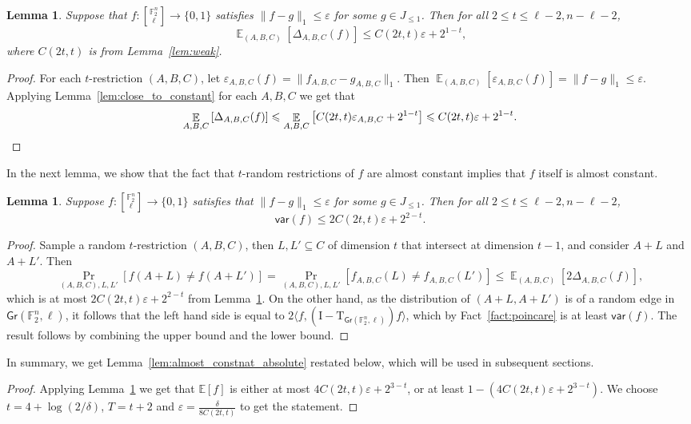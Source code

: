 \documentclass[11pt]{article}
\newtheorem{lemma}[thm]{Lemma}
\newcommand\E{\mathbb{E}}
\newcommand\Prob[2]{{\Pr_{#1}\left[ {#2} \right]}}
\newcommand\norm[1]{\| #1 \|}
\newcommand\Expect[2]{{\mathop{\mathbb{E}}_{#1}\left[ {#2} \right]}}
\newcommand\inner[2]{\langle{#1},{#2}\rangle}
\newcommand\eps{\varepsilon}
\renewcommand\geq{\geqslant}
\renewcommand\leq{\leqslant}
\providecommand{\sqbinom}[2]{\genfrac{[}{]}{0pt}{}{#1}{#2}}
\begin{document}
\begin{lemma}\label{lem:rests_are_constants}
    Suppose that $f\colon {\sqbinom{\mathbb{F}_2^n}{\ell}}\to\{0,1\}$ satisfies
    $\norm{f-g}_1\leq \eps$ for some $g\in J_{\leq 1}$. Then for all $2\leq t\leq \ell-2, n-\ell-2$,
    \[
    \Expect{(A,B,C)}{\Delta_{A,B,C}(f)}\leq C(2t,t)\eps+2^{1-t},
    \]
    where $C(2t,t)$ is from Lemma~\ref{lem:weak}.
\end{lemma}
\begin{proof}
    For each $t$-restriction $(A,B,C)$, let $\eps_{A,B,C}(f) = \norm{f_{A,B,C}-g_{A,B,C}}_1$. Then $\Expect{(A,B,C)}{\eps_{A,B,C}(f)}=\norm{f-g}_1\leq \eps$. Applying Lemma~\ref{lem:close_to_constant} for each $A,B,C$ we get that 
    \[
    \Expect{A,B,C}{\Delta_{A,B,C}(f)}\leq \Expect{A,B,C}{C(2t,t)\eps_{A,B,C}+2^{1-t}}
    \leq C(2t,t)\eps+2^{1-t}.\qedhere
    \]
\end{proof}
In the next lemma, we show that the fact that $t$-random restrictions of $f$ are almost constant implies that $f$ itself is almost constant. 
\begin{lemma}\label{lem:almost_constant}
    Suppose $f\colon{\sqbinom{\mathbb{F}_2^n}{\ell}}\to\{0,1\}$ satisfies that $\norm{f-g}_1\leq \eps$ for some $g\in J_{\leq 1}$. Then for all $2\leq t\leq \ell-2,n-\ell-2$,
    \[
    \mathsf{var}(f)\leq 2C(2t,t)\eps + 2^{2-t}.
    \]
\end{lemma}
\begin{proof}
    Sample a random $t$-restriction $(A,B,C)$, then $L,L'\subseteq C$ of dimension $t$ that intersect at dimension $t-1$, and consider $A+L$ and $A+L'$. Then
    \[
    \Prob{(A,B,C),L,L'}{f(A+L)\neq f(A+L')}
    =\Prob{(A,B,C),L,L'}{f_{A,B,C}(L)\neq f_{A,B,C}(L')}
    \leq \Expect{(A,B,C)}{2\Delta_{A,B,C}(f)},
    \]
    which is at most $2C(2t,t)\eps+2^{2-t}$ from Lemma~\ref{lem:rests_are_constants}. On the other hand, as the distribution of $(A+L, A+L')$ is of a random edge in $\mathsf{Gr}(\mathbb{F}_2^n,\ell)$, it follows that the left hand side is equal to 
    $2\inner{f}{(\mathrm{I}-\mathrm{T}_{\mathsf{Gr}(\mathbb{F}_2^n,\ell)})f}$, which by Fact~\ref{fact:poincare} is at least $\mathsf{var}(f)$. The result follows by combining the upper bound and the lower bound.
\end{proof}
In summary, we get Lemma~\ref{lem:almost_constnat_absolute} restated below, which will be used in subsequent sections.
\MainLemma*
\begin{proof}
   Applying Lemma~\ref{lem:almost_constant} we get that 
   $\E[f]$ is either at most $4C(2t,t)\eps + 2^{3-t}$, or at least $1-(4C(2t,t)\eps + 2^{3-t})$. We choose $t = 4+\log(2/\delta)$,  
   $T = t+2$ and
   $\eps = \frac{\delta}{8 C(2t,t)}$ to get the statement.
\end{proof}
\end{document}

